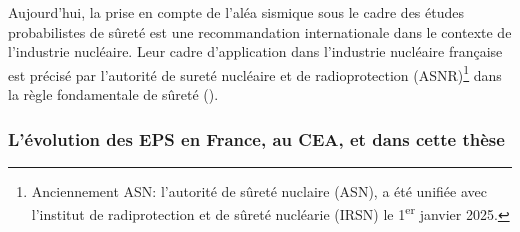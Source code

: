 
Aujourd'hui, la prise en compte de l'aléa sismique sous le cadre des études probabilistes de sûreté est une recommandation internationale dans le contexte de l'industrie nucléaire. Leur cadre d'application dans l'industrie nucléaire française est précisé par l'autorité de sureté nucléaire et de radioprotection (ASNR)\footnote{Anciennement ASN: l'autorité de sûreté nuclaire (ASN), a été unifiée avec l'institut de radiprotection et de sûreté nucléarie (IRSN) le 1\textsuperscript{er} janvier 2025.} dans la règle fondamentale de sûreté (\cite{asn_regle_2002}).









\subsubsection{L'évolution des EPS en France, au CEA, et dans cette thèse}






